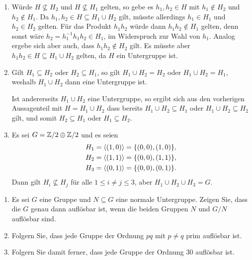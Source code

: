 \begin{solution}
  \begin{enumerate}
    \item
      Würde $H \nsubseteq H_2$ und $H \nsubseteq H_1$ gelten, so gebe es $h_1, h_2 \in H$ mit $h_1 \notin H_2$ und $h_2 \notin H_1$.
      Da $h_1, h_2 \in H \subseteq H_1 \cup H_2$ gilt, müsste allerdings $h_1 \in H_1$ und $h_2 \in H_2$ gelten.
      Für das Produkt $h_1 h_2$ würde dann $h_1 h_2 \notin H_1$ gelten, denn sonst wäre $h_2 = h_1^{-1} h_1 h_2 \in H_1$, im Widerspruch zur Wahl von $h_1$.
      Analog ergebe sich aber auch, dass $h_1 h_2 \notin H_2$ gilt.
      Es müsste aber $h_1 h_2 \in H \subseteq H_1 \cup H_2$ gelten, da $H$ ein Untergruppe ist.
      
    \item
      Gilt $H_1 \subseteq H_2$ oder $H_2 \subseteq H_1$, so gilt $H_1 \cup H_2 = H_2$ oder $H_1 \cup H_2 = H_1$, weshalb $H_1 \cup H_2$ dann eine Untergruppe ist.
      
      Ist andererseits $H_1 \cup H_2$ eine Untergruppe, so ergibt sich aus den vorherigen Aussagenteil mit $H = H_1 \cup H_2$ dass bereits $H_1 \cup H_2 \subseteq H_1$ oder $H_1 \cup H_2 \subseteq H_2$ gilt, und somit $H_2 \subseteq H_1$ oder $H_1 \subseteq H_2$.
      
    \item
      Es sei $G = \mathbb{Z}/2 \oplus \mathbb{Z}/2$ und es seien
      \begin{align*}
        H_1 &= \langle (1,0) \rangle = \{ (0,0), (1,0) \},
        \\
        H_2 &= \langle (1,1) \rangle = \{ (0,0), (1,1) \},
        \\
        H_3 &= \langle (0,1) \rangle = \{ (0,0), (0,1) \}.
      \end{align*}
      Dann gilt $H_i \nsubseteq H_j$ für alle $1 \leq i \neq j \leq 3$, aber $H_1 \cup H_2 \cup H_3 = G$.
  \end{enumerate}
\end{solution}


\begin{question}[subtitle = Zur Auflösbarkeit von Gruppen]
  \begin{enumerate}
    \item
      Es sei $G$ eine Gruppe und $N \subseteq G$ eine normale Untergruppe.
      Zeigen Sie, dass die $G$ genau dann auflösbar ist, wenn die beiden Gruppen $N$ und $G/N$ auflösbar sind.
    \item
      Folgern Sie, dass jede Gruppe der Ordnung $pq$ mit $p \neq q$ prim auflösbar ist.
    \item
      Folgern Sie damit ferner, dass jede Gruppe der Ordnung $30$ auflösbar ist.
  \end{enumerate}
\end{question}


